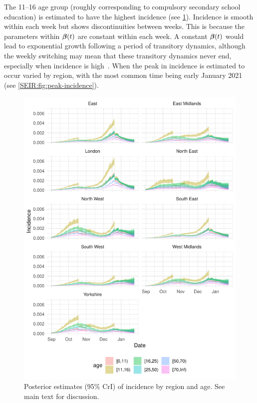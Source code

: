 \documentclass[thesis.tex]{subfiles}
\begin{document}
The 11--16 age group (roughly corresponding to compulsory secondary school education) is estimated to have the highest incidence (see \cref{SEIR:fig:incidence}).
Incidence is smooth within each week but shows discontinuities between weeks.
This is because the parameters within $\bm{\beta}(t)$ are constant within each week.
A constant $\bm{\beta}(t)$ would lead to exponential growth following a period of transitory dynamics, although the weekly switching may mean that these transitory dynamics never end, especially when incidence is high~\autocite{rhodesConvergence}.
When the peak in incidence is estimated to occur varied by region, with the most common time being early January 2021 (see \cref{SEIR:fig:peak-incidence}).
\begin{figure}
    \includegraphics{SEIR/CIS/incidence}
    \caption[Posterior estimates of incidence]{%
        Posterior estimates (95\% CrI) of incidence by region and age.
        See main text for discussion.
    }
    \label{SEIR:fig:incidence}
\end{figure}
\end{document}
